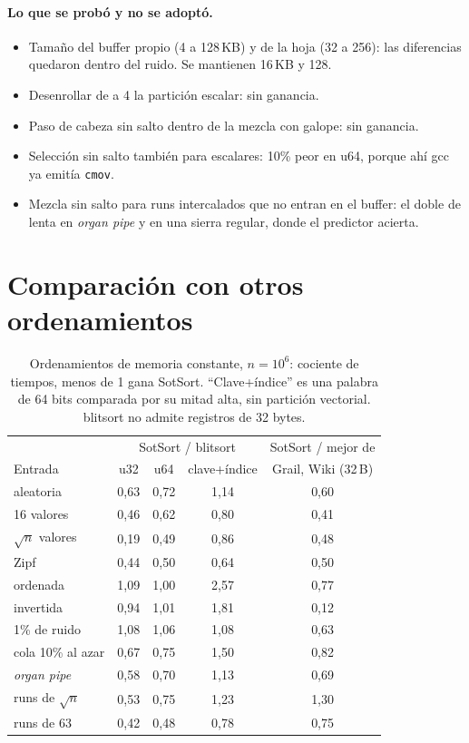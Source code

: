 \documentclass[10pt,a4paper]{article}
\begin{document}
\paragraph{Lo que se probó y no se adoptó.}
\begin{itemize}[nosep]
\item Tamaño del buffer propio (4 a 128\,KB) y de la hoja (32 a 256): las diferencias
  quedaron dentro del ruido. Se mantienen 16\,KB y 128.
\item Desenrollar de a 4 la partición escalar: sin ganancia.
\item Paso de cabeza sin salto dentro de la mezcla con galope: sin ganancia.
\item Selección sin salto también para escalares: 10\% peor en u64, porque ahí gcc ya
  emitía \texttt{cmov}.
\item Mezcla sin salto para runs intercalados que no entran en el buffer: el doble de
  lenta en \emph{organ pipe} y en una sierra regular, donde el predictor acierta.
\end{itemize}

\section{Comparación con otros ordenamientos}

\begin{table}[h]\centering\small
\begin{tabular}{lcccc}
\toprule
 & \multicolumn{3}{c}{SotSort / blitsort} & SotSort / mejor de\\
Entrada & u32 & u64 & clave+índice & Grail, Wiki (32\,B)\\
\midrule
aleatoria & 0,63 & 0,72 & 1,14 & 0,60\\
16 valores & 0,46 & 0,62 & 0,80 & 0,41\\
$\sqrt n$ valores & 0,19 & 0,49 & 0,86 & 0,48\\
Zipf & 0,44 & 0,50 & 0,64 & 0,50\\
ordenada & 1,09 & 1,00 & 2,57 & 0,77\\
invertida & 0,94 & 1,01 & 1,81 & 0,12\\
1\% de ruido & 1,08 & 1,06 & 1,08 & 0,63\\
cola 10\% al azar & 0,67 & 0,75 & 1,50 & 0,82\\
\emph{organ pipe} & 0,58 & 0,70 & 1,13 & 0,69\\
runs de $\sqrt n$ & 0,53 & 0,75 & 1,23 & 1,30\\
runs de 63 & 0,42 & 0,48 & 0,78 & 0,75\\
\bottomrule
\end{tabular}
\caption{Ordenamientos de memoria constante, $n=10^6$: cociente de tiempos, menos de 1
gana SotSort. ``Clave+índice'' es una palabra de 64 bits comparada por su mitad alta, sin
partición vectorial. blitsort no admite registros de 32 bytes.}\label{tab:o1}
\end{table}
\end{document}

